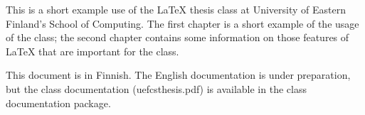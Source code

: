 This is a short example use of the \LaTeX{} thesis class at University of Eastern Finland's School of Computing. The first chapter is a short example of the usage of the class; the second chapter contains some information on those features of \LaTeX{} that are important for the class.

This document is in Finnish. The English documentation is under preparation, but the class documentation (uefcsthesis.pdf) is available in the class documentation package.